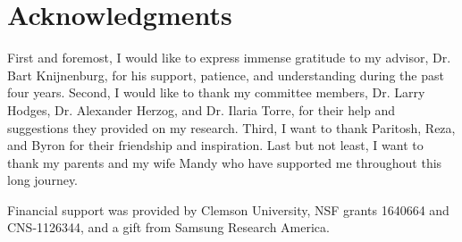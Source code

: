 \chapter*{Acknowledgments}
First and foremost, I would like to express immense	gratitude to my advisor, Dr. Bart Knijnenburg, for his support, patience, and understanding during the past four years. Second, I would like to thank my committee members, Dr. Larry Hodges, Dr. Alexander Herzog, and Dr. Ilaria Torre, for their help and suggestions they provided on my research. Third, I want to thank Paritosh, Reza, and Byron for their friendship and inspiration. Last but not least, I want to thank my parents and my wife Mandy who have supported me throughout this long journey.

Financial support was provided by Clemson University, NSF grants 1640664 and CNS-1126344, and a gift from Samsung Research America.


